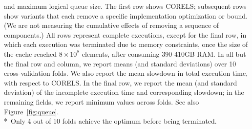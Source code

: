 \begin{table}[t!]
{and maximum logical queue size.
%
The first row shows CORELS; subsequent rows show variants
that each remove a specific implementation optimization or bound.
%
(We are not measuring the cumulative effects of removing a sequence of components.)
%
All rows represent complete executions, except for the final row,
in which each execution was terminated due to memory constraints,
once the size of the cache reached ${8 \times 10^8}$ elements,
after consuming 390-410GB RAM.
%
In all but the final row and column, we report means
(and standard deviations) over 10 cross-validation folds.
%
We also report the  mean slowdown in total execution time,
with respect to CORELS.
%
In the final row, we report the mean (and standard deviation) of the
incomplete execution time and corresponding slowdown;
in the remaining fields, we report minimum values across folds.
%
See also Figure~\ref{fig:queue}. \\
%
*~Only 4 out of 10 folds achieve the optimum before being terminated.
}
\vspace{4mm}
\label{tab:ablation}
\end{table}

